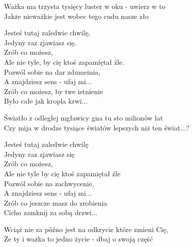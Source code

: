 \begin{text}
    Ważka ma trzysta tysięcy luster w oku - uwierz w to\\
    Jakże nieważkie jest wobec tego cudu nasze zło

    Jesteś tutaj zaledwie chwilę,\\
    Jedyny raz zjawiasz się.\\
    Zrób co możesz,\\
    Ale nie tyle, by cię ktoś zapamiętał źle.\\
    Pozwól sobie na dar zdumeinia,\\
    A znajdziesz sens - ufaj mi...\\
    Zrób co możesz, by twe istnienie\\
    Było całe jak kropla krwi...

    Światło z odległej mgławicy gna tu sto milionów lat\\
    Czy mija w drodze tysiące światów lepszych niż ten świat...?

    Jesteś tutaj zaledwie chwilę\\
    Jedyny raz zjawiasz się\\
    Zrób co możesz,\\
    Ale nie tyle by cię ktoś zapamiętał źle\\
    Pozwól sobie na zachwycenie,\\
    A znajdziesz sens - ufaj mi...\\
    Zrób co jeszcze masz do zrobienia\\
    Cicho zamknij za sobą drzwi...

    Wciąż nie za późno jest na odkrycie które zmieni Cię,\\
    Że ty i ważka to jedno życie - dbaj o swoją część

\end{text}
\begin{chord}

\end{chord}
